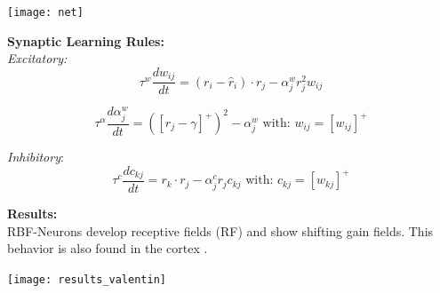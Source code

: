 \documentclass[portrait,final,a0paper,fontscale=0.33]{baposter}
\begin{document}
\begin{poster}
{\begin{adjustbox}{minipage=0.95\textwidth, margin=5pt, center}
\begin{minipage}[r]{0.3\textwidth}
		\begin{center}
			\texttt{[image: net]}
		\end{center}
		
		\vspace{10pt}
		
		\textbf{Synaptic Learning Rules:} \\
		
		\textit{Excitatory:} 
		\footnotesize
		$$\tau^{ w }\frac{ dw_{ ij } }{ dt } = (r_{ i }-\hat r_{ i }) \cdot r_{j}-\alpha^{w}_{j}r^{2}_{j}w_{ij}$$

		$$\tau^{ \alpha }\frac{ d \alpha^{w}_{j}}{ dt } = \left( \left[ r_{j} - \gamma\right]^{+} \right)^{2} - \alpha^{w}_{j} \text{  with:  }  w_{ij} = \left[w_{ij} \right]^{+}$$
		
		
	\end{minipage}
	\hfill
	\begin{minipage}[r]{0.33\textwidth}
		\textit{Inhibitory}:
		\footnotesize
		$$\tau^{ c }\frac{ dc_{ kj } }{ dt } = r_{ k } \cdot r_{ j } -\alpha^{c}_{j}r_{j}c_{kj}
		\text{  with:  }  c_{kj} = \left[w_{kj} \right]^{+}$$
		
		\vspace{5pt}
		\small
		\textbf{Results:} \\
		RBF-Neurons develop receptive fields (RF) and show shifting gain
		fields.	This behavior is also found in the cortex \parencite{pougetComputationalPerspectiveNeural2002}.
		
		\vspace{10pt}
		
		\begin{center}
			\texttt{[image: results\_valentin]}
		\end{center}

		\hfill
	\end{minipage}

	\end{adjustbox}
}



\end{poster}
\end{document}
